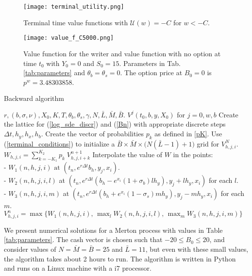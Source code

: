 \begin{figure}[t!]
   \centering
   \texttt{[image: terminal\_utility.png]}
   \caption{Terminal time value functions with $\mathcal{U}(w) = -C$ for $w < -C$.}
   \label{Fig21} 
\end{figure}
\begin{figure}[t!]
   \centering
   \texttt{[image: value\_f\_C5000.png]}
   \caption{Value function for the writer and value function with no option at time $t_0$ with $Y_0=0$ and $S_0=15$. Parameters in Tab. \ref{tab:parameters} and 
   $\theta_b = \theta_s = 0$. 
   The option price at $B_0=0$ is $p^w=3.48303858$.}
   \label{Fig22} 
\end{figure}

\begin{algorithm}[H] 
\caption{Backward algorithm}
\label{algo2}
 \begin{algorithmic}[1]
    \REQUIRE $r, (b,\sigma,\nu), X_0, K, T, \theta_b, \theta_s, \gamma, N, \bar L, \bar M, \bar B. $
    \ENSURE $V^j(t_0,b,y,X_0)$ for $j=0,w,b$
      \STATE Create the lattice for (\ref{log_sde_discr}) and (\ref{Bn}) with appropriate discrete steps $\Delta t, h_y, h_x, h_b$.
      \STATE Create the vector of probabilities $p_k$ as defined in \ref{pK}.  
      \STATE Use (\ref{terminal_conditions}) to initialize a $\bar B \times \bar M \times \bigl( N(\bar L-1)+1 \bigl)$ grid for $V^N_{h,j,i}$.  
      \STATE $W_{h,j,i} = \sum_{k = -K_1}^{K_2} p_k \; V^{n+1}_{h,j,i+k}$
      \STATE Interpolate the value of $W$ in the points: \\
             - $W_1(n,h,j,i) \mbox{ at } (t_n, e^{r \Delta t} b_h, y_j, x_i)$.\\
             - $W_2(n,h,j,i,l)$ at $(t_n, e^{r\Delta t}(b_h - e^{x_i}(1+\sigma_b)l h_y), y_j+l h_y, x_i ) $ for each $l$.\\
             - $W_3(n,h,j,i,m)$ at $(t_n, e^{r\Delta t}(b_h + e^{x_i}(1-\sigma_s)m h_y), y_j-m h_y, x_i ) $ for each $m$. 
      \STATE $V^{n}_{h,j,i} = \max \biggl\{ W_1(n,h,j,i), \, \max_l W_2(n,h,j,i,l), \, \max_m W_3(n,h,j,i,m)  \biggr\}$ 
      \ENDFOR
  \end{algorithmic}
\end{algorithm} 

We present numerical solutions for a Merton process with values in Table \ref{tab:parameters}. 
The cash vector is chosen such that $-20 \leq B_0 \leq 20$, and consider values of $N = \bar M = \bar B = 25$ and $\bar L = 11$, 
but even with these small values, the algorithm takes about 2 hours to run. 
The algorithm is written in Python and runs on a Linux machine with a i7 processor. 


